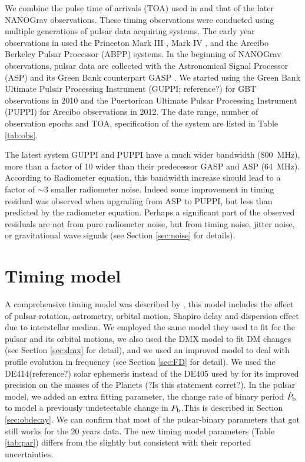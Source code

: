 We combine the pulse time of arrivals (TOA) used in \citealt{sns+05} and that
of the later NANOGrav observations. These timing observations were conducted 
using multiple generations of pulsar data acquiring systems. The early year
observations in \citet{sns+05} used
 the Princeton Mark III \citep{skn+92}, Mark IV
\citep{sst+00}, and the Arecibo Berkeley Pulsar Processor (ABPP) systems. 
In the beginning of NANOGrav observations, pulsar data are collected with the Astronomical Signal
Processor (ASP) and its Green Bank counterpart GASP \citep{dem07}. We
started using 
the Green Bank Ultimate Pulsar Processing Instrument (GUPPI; reference?) for GBT 
observations in 2010 and the Puertorican Ultimate Pulsar Processing Instrument
(PUPPI) for Arecibo observations in 2012. 
The date range, number of observation epochs and TOA, specification of the
system are listed in Table \ref{tab:obs}.

The latest system GUPPI and PUPPI have a much wider bandwidth (800~MHz), more than
a factor of 10 wider than their predecessor GASP and ASP (64~MHz). According to Radiometer 
equation, this bandwidth increase should lead to a factor of $\sim3$
smaller radiometer noise. Indeed some improvement in timing residual was
observed when upgrading from ASP to PUPPI, but less than predicted by the
radiometer equation. Perhaps a
significant part of the observed residuals are
not from pure radiometer noise, but from timing noise, jitter noise, or
gravitational wave signals (see Section \ref{sec:noise} for details).

\section{Timing model}
\label{sec:model}
A comprehensive timing model was described by \citet{sns+05}, this model includes the effect of pulsar rotation, astrometry, orbital motion, Shapiro delay and dispersion effect due to interstellar median.
We employed the same \citet{dd86} model they used to fit for the pulsar and
its orbital motions, we also used the DMX model to fit DM changes (see Section
\ref{sec:dmx} for detail), and we used an improved model to deal with profile
evolution in frequency (see Section \ref{sec:FD} for detail). 
We used the DE414(reference?) solar ephemeris instead of the DE405 used by
\citet{sns+05} for its improved precision on the masses of the Planets (?Is this
statement corret?).
In the pulsar model, we added an extra fitting parameter, the change rate of binary period $\dot{P}_{\rm b}$ to model a previously undetectable change in $P_{\rm b}$.This is described in Section \ref{sec:obdecay}.    
We can confirm that most of the pulsar-binary parameters that \citet{sns+05} got still works for the 20 years data. The new timing model parameters (Table \ref{tab:par}) differs from the \citet{sns+05} slightly but consistent with their reported uncertainties.

